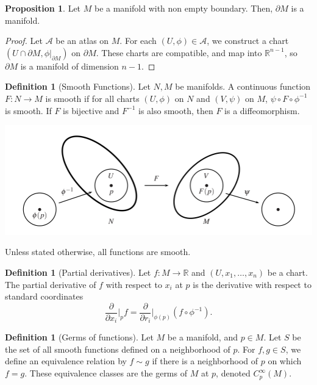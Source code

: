 \documentclass[]{article}
\theoremstyle{definition}
\theoremstyle{definition}
\newtheorem{definition}[theorem]{Definition} %
\newtheorem{proposition}[theorem]{Proposition}
\begin{document}
\begin{proposition}
    Let $M$ be a manifold with non empty boundary. Then, $\partial M$ is a manifold.
\end{proposition}
\begin{proof}
    Let $\mathcal{A}$ be an atlas on $M$. For each $(U, \phi)\in \mathcal{A}$, we construct a chart $(U\cap \partial M , \phi|_{\partial M})$ on $\partial M$. These charts are compatible, and map into $\mathbb{R}^{n-1}$, so $\partial M$ is a manifold of dimension $n-1$.
\end{proof}

\begin{definition}[Smooth Functions]
    Let $N,M$ be manifolds. A continuous function $F:N\rightarrow M$ is smooth if for all charts $(U, \phi)$ on $N$ and $(V, \psi)$ on $M$, $\psi\circ F\circ \phi^{-1}$ is smooth. If $F$ is bijective and $F^{-1}$ is also smooth, then $F$ is a diffeomorphism.
\end{definition}

\begin{center}
    \includegraphics[scale=0.5]{smooth_function.PNG}
\end{center}

Unless stated otherwise, all functions are smooth.

\begin{definition}[Partial derivatives]
    Let $f:M \rightarrow \mathbb{R}$ and $(U, x_1, \dots, x_n)$ be a chart. The partial derivative of $f$ with respect to $x_i$ at $p$ is the derivative with respect to standard coordinates
    \[\frac{\partial}{\partial x_i}\bigg|_p f=\frac{\partial}{\partial r_i}\bigg|_{\phi(p)}(f\circ\phi^{-1}).\]
\end{definition}

\begin{definition}[Germs of functions]
    Let $M$ be a manifold, and $p\in M$. Let $S$ be the set of all smooth functions defined on a neighborhood of $p$. For $f, g\in S$, we define an equivalence relation by $f\sim g$ if there is a neighborhood of $p$ on which $f=g$. These equivalence classes are the germs of $M$ at $p$, denoted $C^\infty_p(M)$.
\end{definition}
\end{document}
